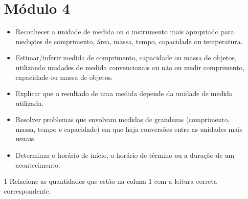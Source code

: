 
\chapter{Módulo 4}



\begin{itemize}
\item Reconhecer a unidade de medida ou o instrumento mais apropriado para
medições de comprimento, área, massa, tempo, capacidade ou temperatura.

\item Estimar/inferir medida de comprimento, capacidade ou massa de objetos,
utilizando unidades de medida convencionais ou não ou medir comprimento,
capacidade ou massa de objetos.

\item Explicar que o resultado de uma medida depende da unidade de medida
utilizada.

\item Resolver problemas que envolvam medidas de grandezas (comprimento,
massa, tempo e capacidade) em que haja conversões entre as unidades mais
usuais.

\item Determinar o horário de início, o horário de término ou a duração de
um acontecimento.
\end{itemize}




\num{1} Relacione as quantidades que estão na coluna 1 com a leitura
correta correspondente.

\begin{multicols}{2}







\end{multicols}


